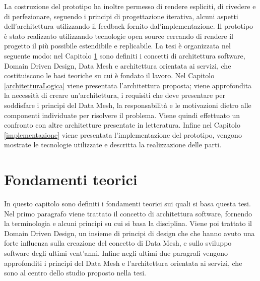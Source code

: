 \documentclass[12pt]{report}
\begin{document}
La costruzione del prototipo ha inoltre permesso di rendere espliciti, di rivedere e di perfezionare, seguendo i principi di progettazione iterativa, alcuni aspetti dell'architettura utilizzando il feedback fornito dal'implementazione.
Il prototipo è stato realizzato utilizzando tecnologie open source cercando di rendere il progetto il più possibile estendibile e replicabile.
La tesi è organizzata nel seguente modo: nel Capitolo \ref{fondamenti teorici} sono definiti i concetti di architettura software, Domain Driven Design, Data Mesh e architettura orientata ai servizi, che costituiscono le basi teoriche su cui è fondato il lavoro.
Nel Capitolo \ref{architetturaLogica} viene presentata l'architettura proposta; viene approfondita la necessità di creare un'architettura, i requisiti che deve presentare per soddisfare i principi del Data Mesh, la responsabilità e le motivazioni dietro alle componenti individuate per risolvere il problema.
Viene quindi effettuato un confronto con altre architetture presentate in letteratura.
Infine nel Capitolo \ref{implementazione} viene presentata l'implementazione del prototipo, vengono mostrate le tecnologie utilizzate e descritta la realizzazione delle parti.

\chapter{Fondamenti teorici}\label{fondamenti teorici}
In questo capitolo sono definiti i fondamenti teorici sui quali si basa questa tesi.
Nel primo paragrafo viene trattato il concetto di architettura software, fornendo la terminologia e alcuni principi su cui si basa la disciplina.
Viene poi trattato il Domain Driven Design, un insieme di principi di design che che hanno avuto una forte influenza sulla creazione del concetto di Data Mesh, e sullo sviluppo software degli ultimi vent'anni.
Infine negli ultimi due paragrafi vengono approfonditi i principi del Data Mesh e l'architettura orientata ai servizi, che sono al centro dello studio proposto nella tesi.
\end{document}
